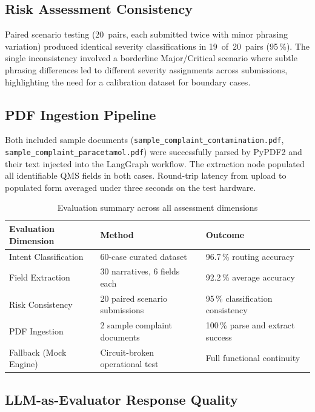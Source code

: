 \documentclass[12pt,a4paper]{report}
\begin{document}
\subsection{Risk Assessment Consistency}

Paired scenario testing (20~pairs, each submitted twice with minor phrasing variation) produced identical severity classifications in 19~of~20~pairs (95\,\%). The single inconsistency involved a borderline Major/Critical scenario where subtle phrasing differences led to different severity assignments across submissions, highlighting the need for a calibration dataset for boundary cases.

\subsection{PDF Ingestion Pipeline}

Both included sample documents (\texttt{sample\_\allowbreak complaint\_\allowbreak contamination.pdf}, \texttt{sample\_\allowbreak complaint\_\allowbreak paracetamol.pdf}) were successfully parsed by PyPDF2 and their text injected into the LangGraph workflow. The extraction node populated all identifiable QMS fields in both cases. Round-trip latency from upload to populated form averaged under three seconds on the test hardware.

\begin{table}[H]
\centering
\caption{Evaluation summary across all assessment dimensions}
\begin{tabular}{p{}p{}p{}}
\toprule
\textbf{Evaluation Dimension} & \textbf{Method} & \textbf{Outcome} \\
\midrule
Intent Classification  & 60-case curated dataset        & 96.7\,\% routing accuracy \\
Field Extraction       & 30 narratives, 6 fields each   & 92.2\,\% average accuracy \\
Risk Consistency       & 20 paired scenario submissions & 95\,\% classification consistency \\
PDF Ingestion          & 2 sample complaint documents   & 100\,\% parse and extract success \\
Fallback (Mock Engine) & Circuit-broken operational test & Full functional continuity \\
\bottomrule
\end{tabular}
\end{table}

\subsection{LLM-as-Evaluator Response Quality}
\end{document}
